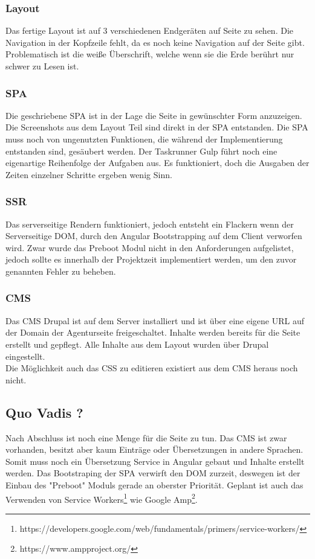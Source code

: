\documentclass[11pt,a4paper]{article}
\begin{document}
\subsubsection{Layout}
Das fertige Layout ist auf 3 verschiedenen Endgeräten auf Seite \pageref{sec:responsive}
zu sehen. Die Navigation in der Kopfzeile fehlt, da es noch keine Navigation auf der Seite gibt.
Problematisch ist die weiße Überschrift, welche wenn sie die Erde berührt nur schwer zu Lesen ist.
\subsubsection{SPA}
Die geschriebene SPA ist in der Lage die Seite in gewünschter Form anzuzeigen. Die Screenshots aus dem Layout Teil sind direkt in der SPA entstanden. Die SPA muss noch von ungenutzten Funktionen, die während der Implementierung entstanden sind, gesäubert werden. Der Taskrunner Gulp führt noch eine eigenartige Reihenfolge der Aufgaben aus. Es funktioniert, doch die Ausgaben der Zeiten einzelner Schritte ergeben wenig Sinn.
\subsubsection{SSR}
Das serverseitige Rendern funktioniert, jedoch entsteht ein Flackern wenn der Serverseitige DOM, durch den Angular Bootstrapping auf dem Client verworfen wird. Zwar wurde das Preboot Modul nicht in den Anforderungen aufgelistet, jedoch sollte es innerhalb der Projektzeit implementiert werden, um den zuvor genannten Fehler zu beheben.
\subsubsection{CMS}
Das \acs{CMS} Drupal ist auf dem Server installiert und ist über eine eigene URL auf der Domain der Agenturseite freigeschaltet. Inhalte werden bereits für die Seite erstellt und gepflegt. Alle Inhalte aus dem Layout wurden über Drupal eingestellt.\\
Die Möglichkeit auch das CSS zu editieren existiert aus dem CMS heraus noch nicht.
\subsection{Quo Vadis ?}
Nach Abschluss ist noch eine Menge für die Seite zu tun.
Das CMS ist zwar vorhanden, besitzt aber kaum Einträge oder Übersetzungen in andere Sprachen.
Somit muss noch ein Übersetzung Service in Angular gebaut und Inhalte erstellt werden. Das Bootstraping der SPA verwirft den DOM zurzeit, deswegen ist der Einbau des "Preboot" Moduls gerade an oberster Priorität. Geplant ist auch das Verwenden von Service Workers\footnote{https://developers.google.com/web/fundamentals/primers/service-workers/} wie Google Amp\footnote{https://www.ampproject.org/}.
\end{document}
